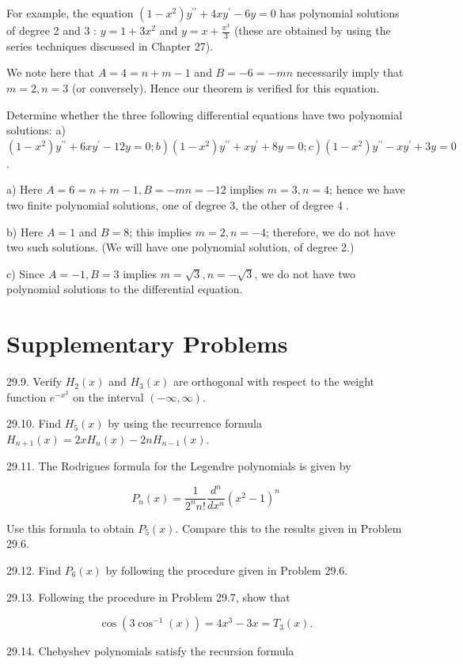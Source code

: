 \documentclass[10pt]{article}
\begin{document}
For example, the equation $\left(1-x^{2}\right) y^{\prime \prime}+4 x y^{\prime}-6 y=0$ has polynomial solutions of degree 2 and 3 : $y=1+3 x^{2}$ and $y=x+\frac{x^{3}}{3}$ (these are obtained by using the series techniques discussed in Chapter 27).

We note here that $A=4=n+m-1$ and $B=-6=-m n$ necessarily imply that $m=2, n=3$ (or conversely). Hence our theorem is verified for this equation.

Determine whether the three following differential equations have two polynomial solutions: a) $\left.\left.\left(1-x^{2}\right) y^{\prime \prime}+6 x y^{\prime}-12 y=0 ; b\right)\left(1-x^{2}\right) y^{\prime \prime}+x y^{\prime}+8 y=0 ; c\right)\left(1-x^{2}\right) y^{\prime \prime}-x y^{\prime}+3 y=0$.

a) Here $A=6=n+m-1, B=-m n=-12$ implies $m=3, n=4$; hence we have two finite polynomial solutions, one of degree 3, the other of degree 4 .

b) Here $A=1$ and $B=8$; this implies $m=2, n=-4$; therefore, we do not have two such solutions. (We will have one polynomial solution, of degree 2.)

c) Since $A=-1, B=3$ implies $m=\sqrt{3}, n=-\sqrt{3}$, we do not have two polynomial solutions to the differential equation.

\section*{Supplementary Problems}
29.9. Verify $H_{2}(x)$ and $H_{3}(x)$ are orthogonal with respect to the weight function $e^{-x^{2}}$ on the interval $(-\infty, \infty)$.

29.10. Find $H_{5}(x)$ by using the recurrence formula $H_{n+1}(x)=2 x H_{n}(x)-2 n H_{n-1}(x)$.

29.11. The Rodrigues formula for the Legendre polynomials is given by

$$
P_{n}(x)=\frac{1}{2^{n} n !} \frac{d^{n}}{d x^{n}}\left(x^{2}-1\right)^{n}
$$

Use this formula to obtain $P_{5}(x)$. Compare this to the results given in Problem 29.6.

29.12. Find $P_{6}(x)$ by following the procedure given in Problem 29.6.

29.13. Following the procedure in Problem 29.7, show that

$$
\cos \left(3 \cos ^{-1}(x)\right)=4 x^{3}-3 x=T_{3}(x) .
$$

29.14. Chebyshev polynomials satisfy the recursion formula
\end{document}
